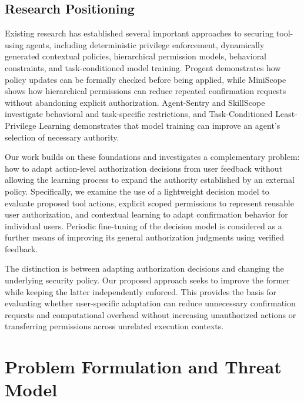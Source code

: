 \documentclass[10pt,conference]{IEEEtran}
\begin{document}
\subsection{Research Positioning}

Existing research has established several important approaches to securing tool-using agents, including deterministic privilege enforcement, dynamically generated contextual policies, hierarchical permission models, behavioral constraints, and task-conditioned model training. Progent demonstrates how policy updates can be formally checked before being applied, while MiniScope shows how hierarchical permissions can reduce repeated confirmation requests without abandoning explicit authorization. Agent-Sentry and SkillScope investigate behavioral and task-specific restrictions, and Task-Conditioned Least-Privilege Learning demonstrates that model training can improve an agent's selection of necessary authority.

Our work builds on these foundations and investigates a complementary problem: how to adapt action-level authorization decisions from user feedback without allowing the learning process to expand the authority established by an external policy. Specifically, we examine the use of a lightweight decision model to evaluate proposed tool actions, explicit scoped permissions to represent reusable user authorization, and contextual learning to adapt confirmation behavior for individual users. Periodic fine-tuning of the decision model is considered as a further means of improving its general authorization judgments using verified feedback.

The distinction is between adapting authorization decisions and changing the underlying security policy. Our proposed approach seeks to improve the former while keeping the latter independently enforced. This provides the basis for evaluating whether user-specific adaptation can reduce unnecessary confirmation requests and computational overhead without increasing unauthorized actions or transferring permissions across unrelated execution contexts.




\section{Problem Formulation and Threat Model}
\end{document}
